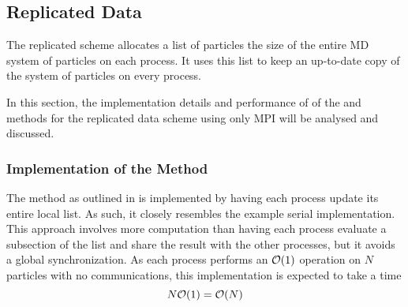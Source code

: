 \subsection{Replicated Data}

The replicated scheme allocates a list of particles the size of
the entire MD system of particles
on each process.
%
It uses this list to keep an up-to-date copy of the system of particles
on every process.

In this section, the implementation details and performance of
of the \individualoperation{} and \pairoperation{} methods
for the replicated data scheme using only MPI will be analysed and discussed.


%
%

\subsubsection{Implementation of the \individualoperation{} Method}

The \individualoperation{} method as outlined in
is implemented by having each process update its entire local list.
%
As such, it closely resembles the example serial implementation.
%
This approach involves more computation than having each process
evaluate a subsection of the list and share the result with the
other processes, but it avoids a global synchronization.
%
As each process performs an $\mathcal{O}{\left({ 1 }\right)}$ operation on $N$ particles with
no communications,
this implementation is expected to take a time
\begin{equation}
\label{eqn:v0_replicated_individual_operation_overall_time}
    N\mathcal{O}{\left({ 1 }\right)} = \mathcal{O}{\left({ N }\right)}
\end  {equation}

\begin{figure}[!h]
    
    \caption{}
    \label{fig:v0_replicated_individual_operation_512_time}
\end  {figure}

\begin{figure}[!h]
    
    \caption{}
    \label{fig:v0_replicated_individual_operation_4096_time}
\end  {figure}

